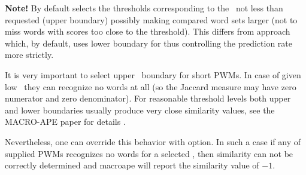 
{\small
\textbf{Note!} By default  selects the thresholds corresponding to the \pvalue\ not 
less than requested (upper boundary) possibly making compared word sets larger (not to miss words with scores too close to the threshold).
This differs from  approach which, by default, uses 
lower boundary for \pvalue thus controlling the prediction rate more strictly.

It is very important to select upper \pvalue\ boundary for short PWMs. In case of given 
low \pvalues\ they can recognize no words at all (so the Jaccard measure may have zero 
numerator and zero denominator). For reasonable threshold levels both upper and lower 
boundaries usually produce very close similarity values, see the MACRO-APE paper for details \cite{MACROAPE}.

Nevertheless, one can override this behavior with  option. In such a case if 
any of supplied PWMs recognizes no words for a selected \pvalue, then similarity can not be 
correctly determined and macroape will report the similarity value of $-1$. 
}
